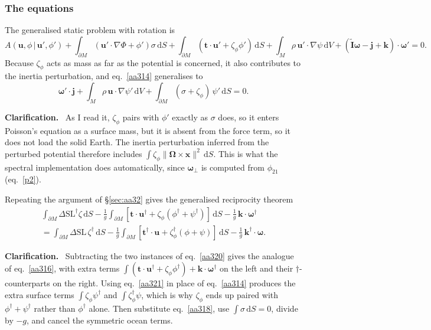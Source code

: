\documentclass[11pt,a4paper]{article}
\newcommand{\bO}{\bm{\Omega}}
\newcommand{\bw}{\bm{\omega}}
\newcommand{\bx}{\mathbf{x}}
\newcommand{\bu}{\mathbf{u}}
\newcommand{\bt}{\mathbf{t}}
\newcommand{\bj}{\mathbf{j}}
\newcommand{\bk}{\mathbf{k}}
\newcommand{\It}{\tilde{\mathbf{I}}}
\newcommand{\dSL}{\Delta\mathrm{SL}}
\newcommand{\dd}{\,\mathrm{d}}
\newcommand{\pM}{\partial M}
\renewenvironment{leftbar}{%
  \def\FrameCommand{{\color{clarbar}\vrule width 2.5pt}\hspace{8pt}}%
  \MakeFramed{\advance\hsize-\width\FrameRestore}}%
  {\endMakeFramed}
\newenvironment{clar}{\begin{leftbar}\small\noindent\textbf{Clarification.}\ }{\end{leftbar}}
\begin{document}
\subsubsection{The equations}

The generalised static problem with rotation is
\begin{equation}
  A(\bu,\phi\,|\,\bu',\phi')+\int_{\pM}(\bu'\cdot\nabla\Phi+\phi')\sigma\dd S+\int_{\pM}(\bt\cdot\bu'+\zeta_\phi\phi')\dd S
  +\int_M\rho\,\bu'\cdot\nabla\psi\dd V+(\It\bw-\bj+\bk)\cdot\bw'=0 .
  \tag{3.20}\label{aa320}
\end{equation}
Because $\zeta_\phi$ acts as mass as far as the potential is concerned, it also contributes to the
inertia perturbation, and eq.~\eqref{aa314} generalises to
\begin{equation}
  \bw'\cdot\bj+\int_M\rho\,\bu\cdot\nabla\psi'\dd V+\int_{\pM}(\sigma+\zeta_\phi)\,\psi'\dd S=0 .
  \tag{3.21}\label{aa321}
\end{equation}

\begin{clar}
As I read it, $\zeta_\phi$ pairs with $\phi'$ exactly as $\sigma$ does, so it enters Poisson's
equation as a surface mass, but it is absent from the force term, so it does not load the solid
Earth. The inertia perturbation inferred from the perturbed potential therefore includes
$\int\zeta_\phi\|\bO\times\bx\|^2\dd S$. This is what the spectral implementation does
automatically, since $\bw_\perp$ is computed from $\phi_{21}$ (eq.~\ref{p2}).
\end{clar}

Repeating the argument of \S\ref{sec:aa32} gives the generalised reciprocity theorem
\begin{multline}
  \int_{\pM}\dSL^\dagger\zeta\dd S-\frac1g\int_{\pM}[\bt\cdot\bu^\dagger+\zeta_\phi(\phi^\dagger+\psi^\dagger)]\dd S-\frac1g\,\bk\cdot\bw^\dagger\\
  =\int_{\pM}\dSL\,\zeta^\dagger\dd S-\frac1g\int_{\pM}[\bt^\dagger\cdot\bu+\zeta^\dagger_\phi(\phi+\psi)]\dd S-\frac1g\,\bk^\dagger\cdot\bw .
  \tag{3.22}\label{aa322}
\end{multline}

\begin{clar}
Subtracting the two instances of eq.~\eqref{aa320} gives the analogue of eq.~\eqref{aa316}, with
extra terms $\int(\bt\cdot\bu^\dagger+\zeta_\phi\phi^\dagger)+\bk\cdot\bw^\dagger$ on the left and
their $\dagger$-counterparts on the right. Using eq.~\eqref{aa321} in place of eq.~\eqref{aa314}
produces the extra surface terms $\int\zeta_\phi\psi^\dagger$ and $\int\zeta_\phi^\dagger\psi$,
which is why $\zeta_\phi$ ends up paired with $\phi^\dagger+\psi^\dagger$ rather than
$\phi^\dagger$ alone. Then substitute eq.~\eqref{aa318}, use $\int\sigma\dd S=0$, divide by $-g$,
and cancel the symmetric ocean terms.
\end{clar}
\end{document}
